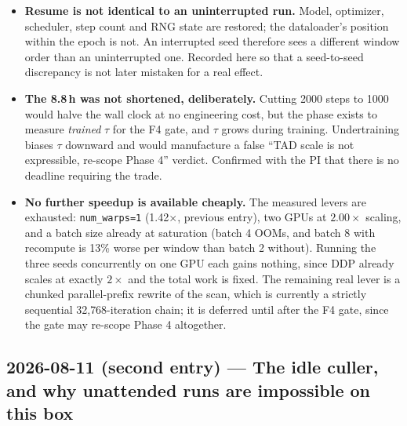 \documentclass[11pt,a4paper]{article}
\newcommand{\code}[1]{\texttt{\small #1}}
\newcommand{\warn}[1]{\textcolor{warncol}{\textbf{#1}}}
\begin{document}
\begin{itemize}
uses \code{pgrep}). The chain behaved as designed: the step-200 checkpoint
survived, the supervisor recorded
\code{ProcessExitedException ... signal SIGKILL} and \code{attempt 1 exit=1},
declined to mark the run complete, and started attempt~2 sixty seconds later.
Resume was then confirmed two ways: the step-200 record was still present in
\code{metrics.json} with step~400 \emph{appended} to it, where a restart from
scratch would have reset the file to a single fresh row; and attempt~2 reached
the step-400 eval 18.2 minutes after starting, which is 200 steps at
5.30\,s/step, not the 400 steps a from-scratch run would have needed. Worst-case
loss from an interruption is therefore one checkpoint interval, under 18
minutes, with no manual intervention.
\item \warn{Resume is not identical to an uninterrupted run.} Model, optimizer,
scheduler, step count and RNG state are restored; the dataloader's position
within the epoch is not. An interrupted seed therefore sees a different window
order than an uninterrupted one. Recorded here so that a seed-to-seed
discrepancy is not later mistaken for a real effect.
\item \textbf{The 8.8\,h was not shortened, deliberately.} Cutting 2000 steps to
1000 would halve the wall clock at no engineering cost, but the phase exists to
measure \emph{trained} $\tau$ for the F4 gate, and $\tau$ grows during training.
Undertraining biases $\tau$ downward and would manufacture a false
``TAD scale is not expressible, re-scope Phase 4'' verdict. Confirmed with the
PI that there is no deadline requiring the trade.
\item \textbf{No further speedup is available cheaply.} The measured levers are
exhausted: \code{num\_warps=1} (1.42$\times$, previous entry), two GPUs at
$2.00\times$ scaling, and a batch size already at saturation (batch 4 OOMs, and
batch 8 with recompute is 13\% worse per window than batch 2 without).
Running the three seeds concurrently on one GPU each gains nothing, since DDP
already scales at exactly $2\times$ and the total work is fixed. The remaining
real lever is a chunked parallel-prefix rewrite of the scan, which is currently
a strictly sequential 32{,}768-iteration chain; it is deferred until after the
F4 gate, since the gate may re-scope Phase 4 altogether.
\end{itemize}

\subsection*{2026-08-11 (second entry) --- The idle culler, and why unattended
runs are impossible on this box}
\end{document}
